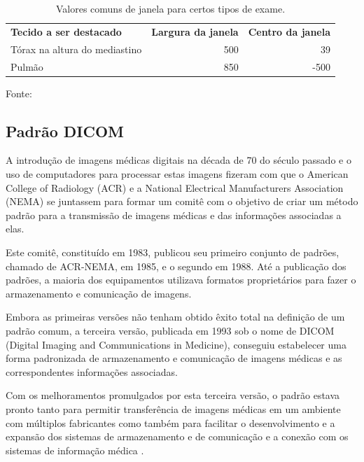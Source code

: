 \begin{table}
 \caption{Valores comuns de janela para certos tipos de exame.}
 \begin{center}
 \begin{tabular}{l|r|r}
 \hline
 	\textbf{Tecido a ser destacado} & \textbf{Largura da janela} & \textbf{Centro da janela} \\
 	Tórax na altura do mediastino & 500 & 39 \\
 	Pulmão & 850 & -500\\
 \hline
 \end{tabular}
 \end{center}
 \begin{description}
  \item Fonte: \citealt{oliveira}
 \end{description}
 \label{tab:janela}
\end{table}

\subsection{Padrão DICOM}

A introdução de imagens médicas digitais na década de 70 do século passado e o uso de computadores para processar estas imagens fizeram com que o American College of Radiology (ACR) e a National Electrical Manufacturers Association (NEMA) se juntassem para formar um comitê com o objetivo de criar um método padrão para a transmissão de imagens médicas e das informações associadas a elas.

Este comitê, constituído em 1983, publicou seu primeiro conjunto de padrões, chamado de ACR-NEMA, em 1985, e o segundo em 1988. Até a publicação dos padrões, a maioria dos equipamentos utilizava formatos proprietários para fazer o armazenamento e comunicação de imagens.

Embora as primeiras versões não tenham obtido êxito total na definição de um padrão comum, a terceira versão, publicada em 1993 sob o nome de DICOM (Digital Imaging and Communications in Medicine), conseguiu estabelecer uma forma padronizada de armazenamento e comunicação de imagens médicas e as correspondentes informações associadas.

Com os melhoramentos promulgados por esta terceira versão, o padrão estava pronto tanto para permitir transferência de imagens médicas em um ambiente com múltiplos fabricantes como também para facilitar o desenvolvimento e a expansão dos sistemas de armazenamento e de comunicação e a conexão com os sistemas de informação médica \cite{nema}.

